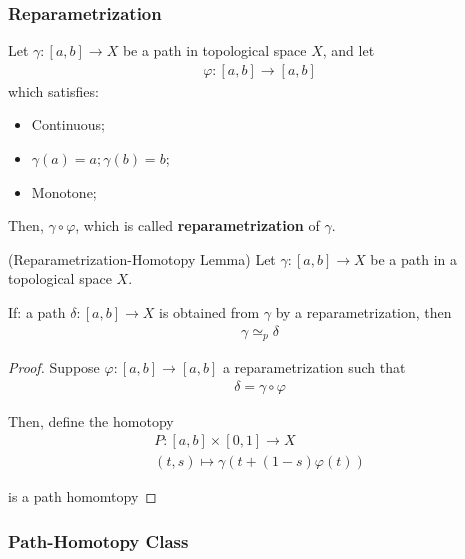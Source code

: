\documentclass[Total.tex]{subfiles}
\begin{document}
	\subsubsection{Reparametrization}
	\begin{Def}
		Let $\gamma:[a,b]\rightarrow X$ be a path in topological space $X$, and let
		\begin{gather*}
			\varphi:[a,b]\rightarrow [a,b]
		\end{gather*}
		which satisfies:
		\begin{itemize}
			\item Continuous;
			\item $\gamma(a)=a;\gamma(b)=b$;
			\item Monotone;
		\end{itemize}
		
		Then, $\gamma\circ\varphi$, which is called \textbf{reparametrization} of $\gamma$.
	\end{Def}
	\begin{lemma}
		(Reparametrization-Homotopy Lemma) Let $\gamma:[a,b]\rightarrow X$ be a path in a topological space $X$.
		
		If: a path $\delta:[a,b]\rightarrow X$ is obtained from $\gamma$ by a reparametrization, then
		\begin{gather*}
			\gamma\simeq_p \delta
		\end{gather*}
	\end{lemma}
	\begin{proof}
		Suppose $\varphi:[a,b]\rightarrow [a,b]$ a reparametrization such that
		\begin{gather*}
			\delta=\gamma\circ \varphi
		\end{gather*}
		
		Then, define the homotopy
		\begin{gather*}
			P:[a,b]\times [0,1]\rightarrow X\\
			(t,s)\mapsto \gamma(t+(1-s)\varphi(t))
		\end{gather*}
		
		is a path homomtopy
	\end{proof}
	\subsubsection{Path-Homotopy Class}
	
\end{document}
